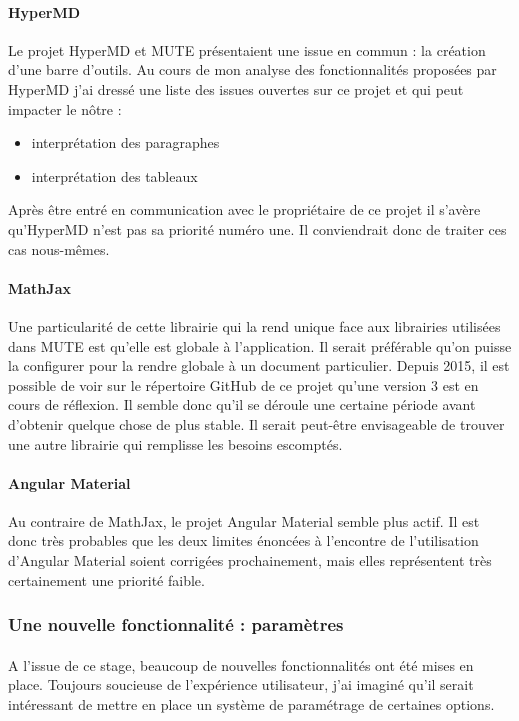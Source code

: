 \documentclass[12pt]{article}
\begin{document}
\paragraph{HyperMD}
Le projet HyperMD et MUTE présentaient une issue en commun : la création d'une barre d'outils. Au cours de mon analyse des fonctionnalités proposées par HyperMD j'ai dressé une liste des issues ouvertes sur ce projet et qui peut impacter le nôtre :
\begin{itemize}
    \item interprétation des paragraphes
    \item interprétation des tableaux
\end{itemize}
Après être entré en communication avec le propriétaire de ce projet il s'avère qu'HyperMD n'est pas sa priorité numéro une. Il conviendrait donc de traiter ces cas nous-mêmes.

\paragraph{MathJax}
Une particularité de cette librairie qui la rend unique face aux librairies utilisées dans MUTE est qu'elle est globale à l'application. Il serait préférable qu'on puisse la configurer pour la rendre globale à un document particulier. Depuis 2015, il est possible de voir sur le répertoire GitHub de ce projet qu'une version 3 est en cours de réflexion. Il semble donc qu'il se déroule une certaine période avant d'obtenir quelque chose de plus stable. Il serait peut-être envisageable de trouver une autre librairie qui remplisse les besoins escomptés.

\paragraph{Angular Material}
Au contraire de MathJax, le projet Angular Material semble plus actif. Il est donc très probables que les deux limites énoncées à l'encontre de l'utilisation d'Angular Material soient corrigées prochainement, mais elles représentent très certainement une priorité faible.

\subsubsection{Une nouvelle fonctionnalité : paramètres}
\paragraph{}
A l'issue de ce stage, beaucoup de nouvelles fonctionnalités ont été mises en place. Toujours soucieuse de l'expérience utilisateur, j'ai imaginé qu'il serait intéressant de mettre en place un système de paramétrage de certaines options.
\end{document}
